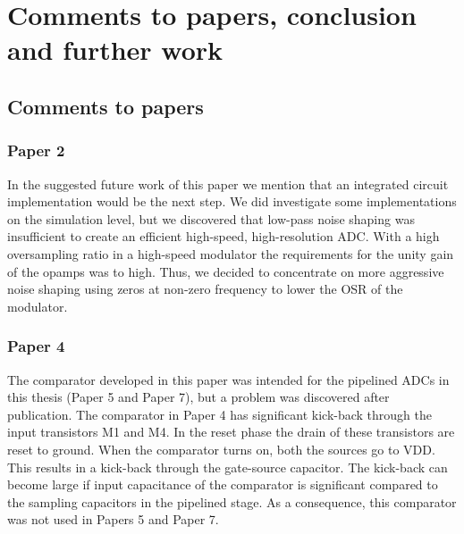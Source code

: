 \chapter{Comments to papers, conclusion and further work}\label{sc:remarks}


\section{Comments to papers}
\subsection{Paper 2}
In the suggested future work of this paper we mention that an integrated circuit
implementation would be the next step. We did investigate some
implementations on the simulation level, but we discovered that low-pass noise
shaping was insufficient to create an efficient high-speed,
high-resolution ADC. With a high oversampling ratio in a high-speed modulator the requirements
for the unity gain of the opamps was to high. Thus, we decided to
concentrate on more aggressive noise shaping using zeros at non-zero
frequency to lower the OSR of the modulator. 

\subsection{Paper 4}
The comparator developed in this paper was intended for the
pipelined ADCs in this thesis (Paper 5 and Paper 7), but a problem was
discovered after publication. The comparator in Paper 4 has
significant kick-back through the input transistors M1 and M4. In the 
reset phase the drain of these transistors are reset to ground. When the
comparator turns on, both the sources go to VDD. This results in a kick-back through the gate-source
capacitor. The kick-back can become large if
input capacitance of the comparator 
is significant compared to the sampling capacitors in the pipelined stage. As a consequence, 
this comparator was not used in Papers 5 and Paper 7.

